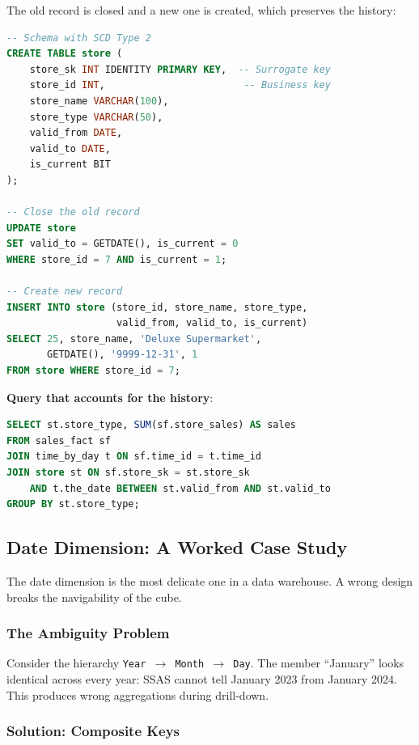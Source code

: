 The old record is closed and a new one is created, which preserves the history:
\begin{lstlisting}[language=SQL]
-- Schema with SCD Type 2
CREATE TABLE store (
    store_sk INT IDENTITY PRIMARY KEY,  -- Surrogate key
    store_id INT,                        -- Business key
    store_name VARCHAR(100),
    store_type VARCHAR(50),
    valid_from DATE,
    valid_to DATE,
    is_current BIT
);

-- Close the old record
UPDATE store
SET valid_to = GETDATE(), is_current = 0
WHERE store_id = 7 AND is_current = 1;

-- Create new record
INSERT INTO store (store_id, store_name, store_type,
                   valid_from, valid_to, is_current)
SELECT 25, store_name, 'Deluxe Supermarket',
       GETDATE(), '9999-12-31', 1
FROM store WHERE store_id = 7;
\end{lstlisting}

\textbf{Query that accounts for the history}:
\begin{lstlisting}[language=SQL]
SELECT st.store_type, SUM(sf.store_sales) AS sales
FROM sales_fact sf
JOIN time_by_day t ON sf.time_id = t.time_id
JOIN store st ON sf.store_sk = st.store_sk
    AND t.the_date BETWEEN st.valid_from AND st.valid_to
GROUP BY st.store_type;
\end{lstlisting}

\subsection{Date Dimension: A Worked Case Study}
\label{sec:date-dimension-case-study}

The date dimension is the most delicate one in a data warehouse. A wrong design breaks the navigability of the cube.

\subsubsection{The Ambiguity Problem}
\label{subsec:date-ambiguity}

Consider the hierarchy \texttt{Year $\to$ Month $\to$ Day}. The member ``January'' looks identical across every year: SSAS cannot tell January 2023 from January 2024. This produces wrong aggregations during drill-down.

\subsubsection{Solution: Composite Keys}
\label{subsec:date-composite-keys}

